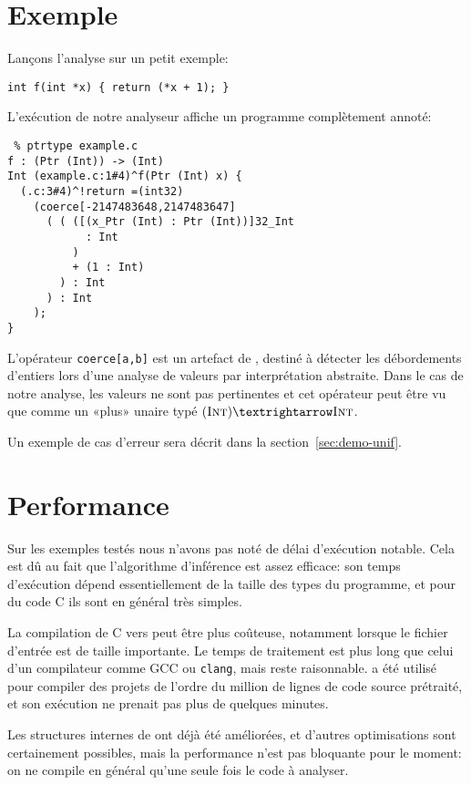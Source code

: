\section{Exemple}

Lançons l'analyse sur un petit exemple:

\begin{verbatim}
int f(int *x) { return (*x + 1); }
\end{verbatim}

L'exécution de notre analyseur affiche un programme complètement annoté:

\begin{verbatim}
 % ptrtype example.c
f : (Ptr (Int)) -> (Int)
Int (example.c:1#4)^f(Ptr (Int) x) {
  (.c:3#4)^!return =(int32)
    (coerce[-2147483648,2147483647]
      ( ( ([(x_Ptr (Int) : Ptr (Int))]32_Int
            : Int
          )
          + (1 : Int)
        ) : Int
      ) : Int
    );
}
\end{verbatim}

L'opérateur \texttt{coerce[a,b]} est un artefact de \newspeak, destiné à détecter
les débordements d'entiers lors d'une analyse de valeurs par interprétation
abstraite. Dans le cas de notre analyse, les valeurs ne sont pas pertinentes et
cet opérateur peut être vu que comme un «plus» unaire typé $(\tInt) → \tInt$.

Un exemple de cas d'erreur sera décrit dans la section~\ref{sec:demo-unif}.

\section{Performance}

Sur les exemples testés nous n'avons pas noté de délai d'exécution notable. Cela
est dû au fait que l'algorithme d'inférence est assez efficace: son temps
d'exécution dépend essentiellement de la taille des types du programme, et pour
du code C ils sont en général très simples.

La compilation de C vers \newspeak peut être plus coûteuse, notamment lorsque
le fichier d'entrée est de taille importante. Le temps de traitement est plus
long que celui d'un compilateur comme GCC ou \texttt{clang}, mais reste
raisonnable. \ctonewspeak a été utilisé pour compiler des projets de l'ordre du
million de lignes de code source prétraité, et son exécution ne prenait pas plus
de quelques minutes.

Les structures internes de \ctonewspeak ont déjà été améliorées, et d'autres
optimisations sont certainement possibles, mais la performance n'est pas
bloquante pour le moment: on ne compile en général qu'une seule fois le code à
analyser.

